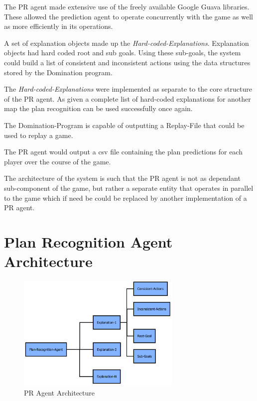 \documentclass[parskip]{cs4rep}
\begin{document}
The PR agent made extensive use of the freely available Google Guava libraries. These allowed the prediction agent to operate concurrently with the game as well as more efficiently in its operations.

A set of explanation objects made up the \textit{Hard-coded-Explanations}. Explanation objects had hard coded root and sub goals. Using these sub-goals, the system could build a list of consistent and inconsistent actions using the data structures stored by the Domination program. 

The \textit{Hard-coded-Explanations} were implemented as separate to the core structure of the PR agent. As given a complete list of hard-coded explanations for another map the plan recognition can be used successfully once again.

The Domination-Program is capable of outputting a Replay-File that could be used to replay a game.

The PR agent would output a csv file containing the plan predictions for each player over the course of the game.

The architecture of the system is such that the PR agent is not as dependant sub-component of the game, but rather a separate entity that operates in parallel to the game which if need be could be replaced by another implementation of a PR agent.

\newpage

\section{Plan Recognition Agent Architecture}

\begin{figure}[h]
\centerline{
\includegraphics[width=0.7\textwidth]{images/plan-recognition-agent-architecture}
}
\caption{PR Agent Architecture}
\end{figure} 
\end{document}

